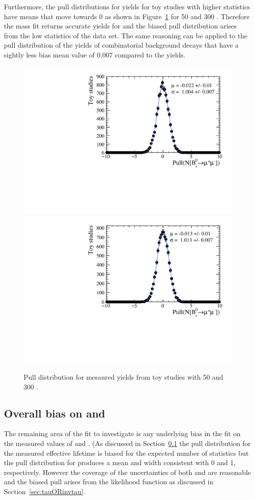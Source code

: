 Furthermore, the pull distributions for \bsmumu yields for toy studies with higher statistics have means that move towards 0 as shown in Figure~\ref{fig:BsmumuYieldPulls} for 50 and 300 \fb. Therefore the mass fit returns accurate yields for \bsmumu and the biased pull distribution arises from the low statistics of the data set. The same reasoning can be applied to the pull distribution of the yields of combinatorial background decays that have a sightly less bias mean value of 0.007 compared to the \bsmumu yields.

\begin{figure}[htbp]
    \centering
        \includegraphics[width=0.49 \textwidth]{./Figs/LifetimeSystematics/Bs2MuMu_yield_pull_50fb.pdf}
        \includegraphics[width=0.49 \textwidth]{./Figs/LifetimeSystematics/Bs2MuMu_yield_pull_300fb.pdf}
    \caption{Pull distribution for \bsmumu mesaured yields from toy studies with 50 and 300 \fb.}
    \label{fig:BsmumuYieldPulls}
\end{figure}


\subsection{Overall bias on \tmumu and \Gmumu}
The remaining area of the fit to investigate is any underlying bias in the fit on the measured values of \tmumu and \Gmumu. (As discussed in Section~\ref{} the pull distribution for the measured effective lifetime is biased for the expected number of statistics but the pull distribution for \Gmumu produces a mean and width consistent with 0 and 1, respectively. However the coverage of the uncertainties of both \mmumu and \Gmumu are reasonable and the biased \tmumu pull arises from the likelihood function as discussed in Section~\ref{sec:tauORinvtau}. 

